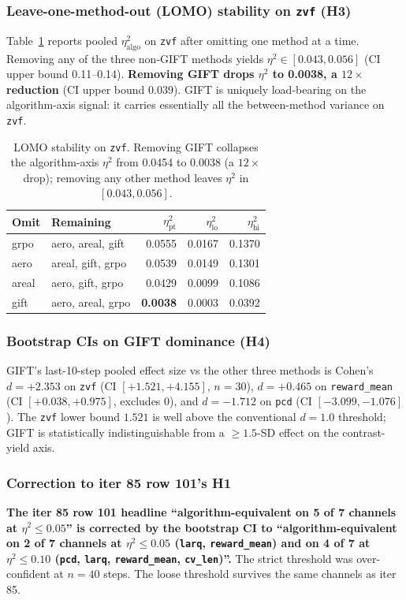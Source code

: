 \documentclass{article}  \usepackage[preprint,nonatbib]{neurips_2026} \usepackage[numbers]{natbib}
\begin{document}
\subsubsection{Leave-one-method-out (LOMO) stability on \texttt{zvf} (H3)}
\label{sec:p5-iter89-h3}
Table~\ref{tab:p5-iter89-lomo} reports pooled $\eta^2_{\mathrm{algo}}$
on \texttt{zvf} after omitting one method at a time. Removing any of
the three non-GIFT methods yields $\eta^2 \in [0.043, 0.056]$ (CI
upper bound 0.11--0.14). \textbf{Removing GIFT drops $\eta^2$ to
0.0038, a $12\times$ reduction} (CI upper bound 0.039). GIFT is
uniquely load-bearing on the algorithm-axis signal: it carries
essentially all the between-method variance on \texttt{zvf}.

\begin{table}[ht]
\centering\small
\begin{tabular}{llrrr}
\toprule
Omit & Remaining & $\eta^2_{\mathrm{pt}}$ & $\eta^2_{\mathrm{lo}}$ & $\eta^2_{\mathrm{hi}}$ \\
\midrule
grpo  & aero, areal, gift & 0.0555 & 0.0167 & 0.1370 \\
aero  & areal, gift, grpo & 0.0539 & 0.0149 & 0.1301 \\
areal & aero, gift, grpo  & 0.0429 & 0.0099 & 0.1086 \\
gift  & aero, areal, grpo & \textbf{0.0038} & 0.0003 & 0.0392 \\
\bottomrule
\end{tabular}
\caption{LOMO stability on \texttt{zvf}. Removing GIFT collapses the
algorithm-axis $\eta^2$ from 0.0454 to 0.0038 (a $12\times$ drop);
removing any other method leaves $\eta^2$ in $[0.043, 0.056]$.}
\label{tab:p5-iter89-lomo}
\end{table}

\subsubsection{Bootstrap CIs on GIFT dominance (H4)}
\label{sec:p5-iter89-h4}
GIFT's last-10-step pooled effect size vs the other three methods is
Cohen's $d{=}+2.353$ on \texttt{zvf} (CI $[+1.521, +4.155]$,
$n{=}30$), $d{=}+0.465$ on \texttt{reward\_mean} (CI $[+0.038,
+0.975]$, excludes 0), and $d{=}-1.712$ on \texttt{pcd} (CI
$[-3.099, -1.076]$). The \texttt{zvf} lower bound $1.521$ is well
above the conventional $d{=}1.0$ threshold; GIFT is statistically
indistinguishable from a $\geq 1.5$-SD effect on the contrast-yield
axis.

\subsubsection{Correction to iter 85 row 101's H1}
\label{sec:p5-iter89-correction}
\textbf{The iter 85 row 101 headline ``algorithm-equivalent on 5 of 7
channels at $\eta^2 \leq 0.05$'' is corrected by the bootstrap CI
to ``algorithm-equivalent on 2 of 7 channels at $\eta^2 \leq 0.05$
(\texttt{larq}, \texttt{reward\_mean}) and on 4 of 7 at
$\eta^2 \leq 0.10$ (\texttt{pcd}, \texttt{larq},
\texttt{reward\_mean}, \texttt{cv\_len})''.} The strict threshold
was over-confident at $n{=}40$ steps. The loose threshold survives
the same channels as iter 85.
\end{document}
